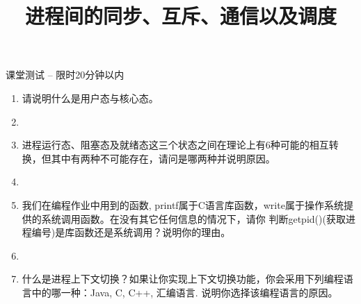 \documentclass[xcolor=svgnames]{beamer}
\begin{document}
\begin{CJK*}{UTF8}{gbsn}


\title{进程间的同步、互斥、通信以及调度}


\begin{frame}{课堂测试 -- 限时20分钟以内}
\begin{enumerate}
\item 请说明什么是用户态与核心态。
\item[]
\item 进程运行态、阻塞态及就绪态这三个状态之间在理论上有6种可能的相互转换，但其中有两种不可能存在，请问是哪两种并说明原因。
\item[]
\item 我们在编程作业中用到的函数, printf属于C语言库函数，write属于操作系统提供的系统调用函数。在没有其它任何信息的情况下，请你
判断getpid()(获取进程编号)是库函数还是系统调用？说明你的理由。
\item[]
\item 什么是进程上下文切换？如果让你实现上下文切换功能，你会采用下列编程语言中的哪一种：Java, C, C++, 汇编语言.
说明你选择该编程语言的原因。
\end{enumerate}
\end{frame}



\end{CJK*}
\end{document}
